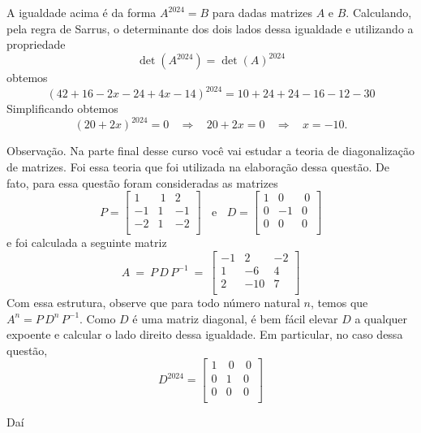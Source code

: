 \begin{solution} A igualdade acima é da forma $A^{2024} = B$ para dadas matrizes $A$ e $B$. \linebreak
Calculando, pela regra de Sarrus, o determinante dos dois lados dessa igualdade e \linebreak utilizando a propriedade
$$\det\left( A^{2024} \right) = \det\left(A\right)^{2024}$$
obtemos
$$ \left( 42 + 16 - 2x -24 + 4x - 14 \right)^{2024} = 10 + 24 + 24 - 16 - 12 - 30 $$
Simplificando obtemos
$$\left( 20 + 2x \right)^{2024} = 0 \ \ \ \ \Rightarrow \ \ \ \ 20+2x=0 \ \ \ \ \Rightarrow \ \ \ \ x=-10.$$

\bigskip
Observação. Na parte final desse curso você vai estudar a teoria de diagonalização de matrizes. Foi essa teoria que foi utilizada na elaboração dessa questão. De fato, para essa questão foram consideradas as matrizes
$$P = \left[ \begin{array}{rrr}
  1 & \ 1  &  2 \\
 -1 &   1  & -1 \\
 -2 &   1  & -2 \\
\end{array}\right] \ \ \ \ \text{e} \ \ \ \ 
D = \left[ \begin{array}{rrr}
  1 &   0  & \ 0 \\
  0 &  -1  &   0 \\
  0 &   0  &   0 \\
\end{array}\right]$$
e foi calculada a seguinte matriz
$$A\ =\ P\, D\, P^{-1}\ =\ \left[ \begin{array}{rrr}
 -1 &   2  & -2 \\
  1 &  -6  &  4 \\
  2 &  -10 &  7 \\
\end{array}\right]$$
Com essa estrutura, observe que para todo número natural $n$, temos que $A^n = P\, D^n \, P^{-1}$. Como $D$ é uma matriz diagonal, é bem fácil elevar $D$ a qualquer expoente e calcular o lado direito dessa igualdade.
Em particular, no caso dessa questão,
$$D^{2024} =\left[ \begin{array}{rrr}
  1 & \ 0  & \  0 \\
  0 &   1  &    0 \\
  0 &   0  &    0 \\
\end{array}\right]$$

Daí


\end{solution}
